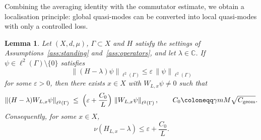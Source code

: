 \documentclass[11pt]{article}
\newtheorem{lemma}[theorem]{Lemma}
\theoremstyle{definition}
\newcommand{\C}{\mathbb{C}}
\newcommand{\ellTwo}{\ell^2}
\newcommand{\norm}[1]{\left\|#1\right\|}
\newcommand{\nuop}{\nu}
\begin{document}
Combining the averaging identity with the commutator estimate, we obtain a
localisation principle: global quasi-modes can be converted into local
quasi-modes with only a controlled loss.

\begin{lemma}\label{lem:localise}
Let $(X,d,\mu)$, $\Gamma \subset X$ and $H$ satisfy the settings of Assumptions~\ref{ass:standing}
and~\ref{ass:operators}, and let $\lambda\in\C$.
If $\psi\in\ellTwo(\Gamma)\setminus\{0\}$ satisfies
\[
  \norm{(H-\lambda)\psi}_{\ell^2(\Gamma)}\le \varepsilon\,\norm{\psi}_{\ell^2(\Gamma)}
\]
for some $\varepsilon>0$, then there exists $x\in X$ with $W_{L,x}\psi\neq 0$ such that
\[
  \norm{(H-\lambda)W_{L,x}\psi}_{\ell^2(\Gamma)}
  \;\le\;
  \Bigl(\varepsilon+\frac{C_0}{L}\Bigr)\,\norm{W_{L,x}\psi}_{\ell^2(\Gamma)},
  \qquad
  C_0\coloneqq \gamma mM\sqrt{C_{\mathrm{geom}}}.
\]
Consequently, for some $x\in X$,
\[
  \nuop(H_{L,x}-\lambda)\le \varepsilon+\frac{C_0}{L}.
\]
\end{lemma}
\end{document}
